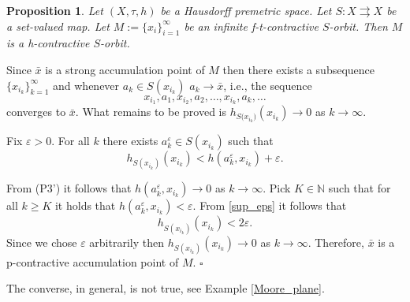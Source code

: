 \documentclass{article}
\newcommand{\N}{\mathbb{N}}
\renewenvironment{proof}
         {\begin{trivlist}\item[
         {\bf Proof.}]}{{\hfill $\square$} \end{trivlist}}
\newtheorem{prop}[theo]{Proposition}
\begin{document}
\begin{prop} \label{t=>p}  Let $(X, \tau, h)$ be a Hausdorff premetric space. Let $S:X \rightrightarrows X$ be a set-valued map. Let $M:=\{x_i\}_{i=1}^{\infty}$ be an infinite f-t-contractive $S$-orbit. Then $M$ is a h-contractive $S$-orbit.
\end{prop}
\begin{proof} Since $\bar{x}$ is a strong accumulation point of $M$ then there exists a subsequence $\{x_{i_k}\}_{k=1}^{\infty}$ and whenever $a_k \in S(x_{i_k})$  $a_k \rightarrow \bar{x}$, i.e., the sequence
\[x_{i_1},a_1,x_{i_2},a_2,\dots,x_{i_k},a_k,\dots\]
converges to $\bar{x}$.
What remains to be proved is $h_{{S(x_{i_k}})}(x_{i_k}) \rightarrow 0$ as $k \rightarrow \infty$.

Fix $\varepsilon>0$. For all $k$ there exists $a_k^{\varepsilon} \in S(x_{i_k})$ such that
\begin{equation} \label{sup_eps}
h_{S(x_{i_k})}(x_{i_k})<h(a_k^{\varepsilon},x_{i_k})+\varepsilon.
\end{equation}

From (P3') it follows that $h(a_k^{\varepsilon}, x_{i_k}) \rightarrow 0$ as $k \rightarrow \infty$. Pick $K \in \N$ such that for all $k \geq K$ it holds that $h(a_k^{\varepsilon}, x_{i_k}) < \varepsilon$. From \ref{sup_eps} it follows that 
\[
h_{S(x_{i_k})}(x_{i_k})<2\varepsilon. 
\]
Since we chose $\varepsilon$ arbitrarily then $h_{S(x_{i_k})}(x_{i_k}) \rightarrow 0$ as $k \rightarrow \infty$. Therefore, $\bar{x}$ is a p-contractive accumulation point of $M$.
\end{proof}
The converse, in general, is not true, see Example \ref{Moore_plane}.
\end{document}
